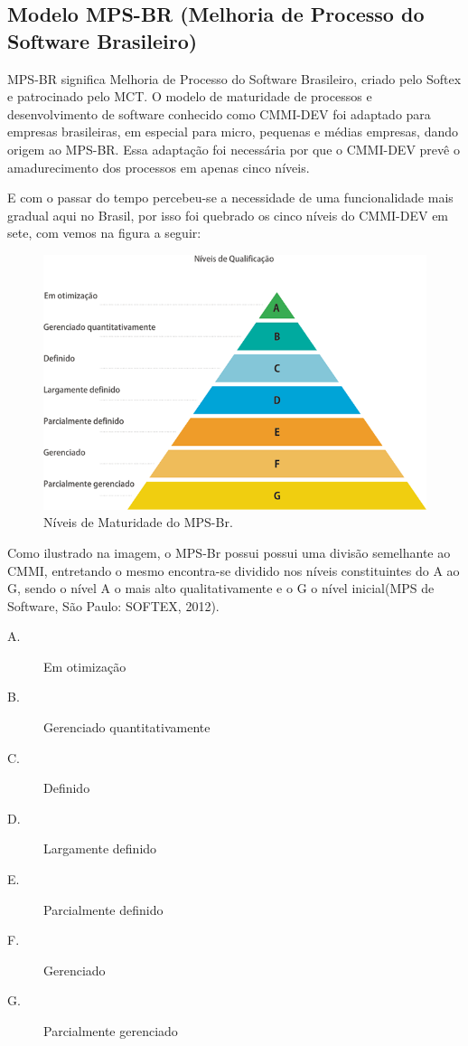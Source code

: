   \subsection{Modelo MPS-BR (Melhoria de Processo do Software Brasileiro)} \label{mps-br}
MPS-BR significa Melhoria de Processo do Software Brasileiro, criado pelo Softex e patrocinado pelo MCT. O modelo de maturidade de processos e desenvolvimento de software conhecido como CMMI-DEV foi adaptado para empresas brasileiras, em especial para micro, pequenas e médias empresas, dando origem ao MPS-BR. Essa adaptação foi necessária por que o CMMI-DEV prevê o amadurecimento dos processos em apenas cinco níveis.

E com o passar do tempo percebeu-se a necessidade de uma funcionalidade mais gradual aqui no Brasil, por isso foi quebrado os cinco níveis do CMMI-DEV em sete, com vemos na figura a seguir:
  \begin{figure}[!htbp]
    \centering
    \includegraphics[scale=0.5]{figuras/650x432xniveis_de_qualificacao}
    \caption[Níveis de Maturidade do MPS-Br]{Níveis de Maturidade do MPS-Br. \footnotemark}
    \label{niveis-maturidade-mps-br}
  \end{figure}
  
Como ilustrado na imagem, o MPS-Br possui possui uma divisão semelhante ao CMMI, entretando o mesmo encontra-se dividido nos níveis constituintes do A ao G, sendo o nível A o mais alto qualitativamente e o G o nível inicial(MPS de Software, São Paulo: SOFTEX, 2012).	
\begin{description}
\item[A.] Em otimização
\item[B.] Gerenciado quantitativamente
\item[C.] Definido
\item[D.] Largamente definido
\item[E.] Parcialmente definido
\item[F.] Gerenciado
\item[G.] Parcialmente gerenciado	
\end{description}			


